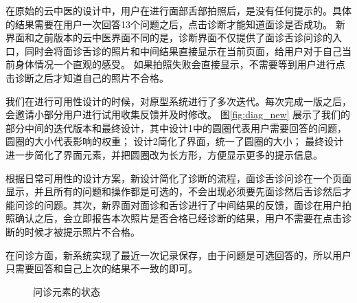 在原始的云中医的设计中，用户在进行面部舌部拍照后，是没有任何提示的。具体的结果需要在用户一次回答13个问题之后，点击诊断才能知道面诊是否成功。
新界面和之前版本的云中医界面不同的是，诊断界面不仅提供了面诊舌诊问诊的入口，同时会将面诊舌诊的照片和中间结果直接显示在当前页面，给用户对于自己当前身体情况一个直观的感受。
如果拍照失败会直接显示，不需要等到用户进行点击诊断之后才知道自己的照片不合格。
    
我们在进行可用性设计的时候，对原型系统进行了多次迭代。每次完成一版之后，会邀请小部分用户进行试用收集反馈并及时修改。
图\ref{fig:diag_new} 展示了我们的部分中间的迭代版本和最终设计，其中设计1中的圆圈代表用户需要回答的问题，圆圈的大小代表影响的权重；
设计2简化了界面，统一了圆圈的大小；
最终设计进一步简化了界面元素，并把圆圈改为长方形，方便显示更多的提示信息。

根据日常可用性的设计方案，新设计简化了诊断的流程，面诊舌诊问诊在一个页面显示，并且所有的问题和操作都是可选的，不会出现必须要先面诊然后舌诊然后才能问诊的问题。其次，新界面对面诊和舌诊进行了中间结果的反馈，面诊在用户拍照确认之后，会立即报告本次照片是否合格已经诊断的结果，用户不需要在点击诊断的时候才被提示照片不合格。

在问诊方面，新系统实现了最近一次记录保存，由于问题是可选回答的，所以用户只需要回答和自己上次的结果不一致的即可。

\begin{figure}
    \centering
    \caption{问诊元素的状态}
\end{figure}

